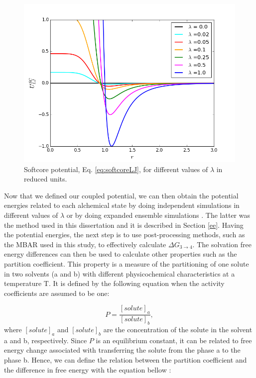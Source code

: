     \begin{figure}[H]
    	\centering
    	\includegraphics[width=0.9\linewidth]{Figures/soft}
    	\caption{Softcore potential, Eq. \ref{eq:softcoreLJ}, for different values of $\lambda$ in reduced units.}
    	\label{fig:SC}
    \end{figure}
    
    Now that we defined our coupled potential, we can then obtain the potential energies related to each alchemical state by doing independent simulations in different values of $\lambda$ or by doing expanded ensemble simulations \cite{lyubartsev}. The latter was the method used in this dissertation and it is described in Section \ref{ee}. Having the potential energies, the next step is to use post-processing methods, such as the MBAR used in this study, to effectively calculate $\Delta G_{3 \rightarrow 4}$.  The solvation free energy differences can then be used to calculate other properties such as the partition coefficient. This property is a measure of the partitioning of one solute in two solvents (a and b) with different physicochemical characteristics  at a temperature T. It is defined by the following equation when the activity coefficients are assumed to be one:
    
    \begin{equation}
    P = \dfrac{[solute]_{a}}{[solute]_{b}},
    \end{equation} 
    where $[solute]_{a}$ and $[solute]_{b}$ are the concentration of the solute in the solvent a and b, respectively. Since $P$ is an equilibrium constant, it can be related to free energy change associated with transferring the solute from the phase a to the phase b. Hence, we can define the relation between the partition coefficient and the difference in free energy with the equation bellow \cite{doi:10.1021/ja00036a009}:  
    
